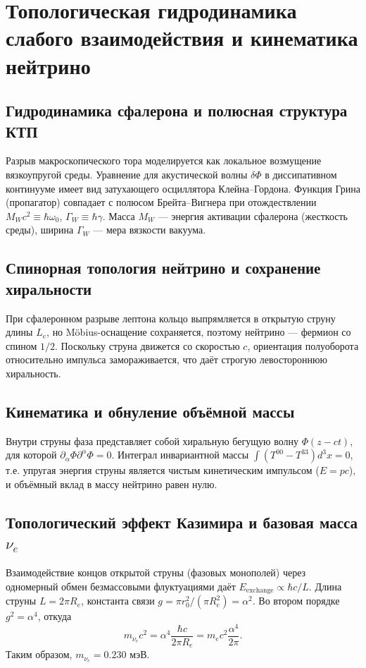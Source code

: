 \documentclass[11pt,a4paper]{article}
\begin{document}
	\section{Топологическая гидродинамика слабого взаимодействия и кинематика нейтрино}
	
	\subsection{Гидродинамика сфалерона и полюсная структура КТП}
	Разрыв макроскопического тора моделируется как локальное возмущение вязкоупругой среды. Уравнение для акустической волны $\delta\Phi$ в диссипативном континууме имеет вид затухающего осциллятора Клейна–Гордона. Функция Грина (пропагатор) совпадает с полюсом Брейта–Вигнера при отождествлении $M_W c^2\equiv\hbar\omega_0$, $\Gamma_W\equiv\hbar\gamma$. Масса $M_W$ — энергия активации сфалерона (жесткость среды), ширина $\Gamma_W$ — мера вязкости вакуума.
	
	\subsection{Спинорная топология нейтрино и сохранение хиральности}
	При сфалеронном разрыве лептона кольцо выпрямляется в открытую струну длины $L_e$, но Möbius-оснащение сохраняется, поэтому нейтрино — фермион со спином $1/2$. Поскольку струна движется со скоростью $c$, ориентация полуоборота относительно импульса замораживается, что даёт строгую левостороннюю хиральность.
	
	\subsection{Кинематика и обнуление объёмной массы}
	Внутри струны фаза представляет собой хиральную бегущую волну $\Phi(z-ct)$, для которой $\partial_\alpha\Phi\partial^\alpha\Phi=0$. Интеграл инвариантной массы $\int(T^{00}-T^{33})d^3x=0$, т.е. упругая энергия струны является чистым кинетическим импульсом ($E=pc$), и объёмный вклад в массу нейтрино равен нулю.
	
	\subsection{Топологический эффект Казимира и базовая масса $\nu_e$}
	Взаимодействие концов открытой струны (фазовых монополей) через одномерный обмен безмассовыми флуктуациями даёт $E_{\text{exchange}} \propto \hbar c/L$. Длина струны $L=2\pi R_e$, константа связи $g = \pi r_0^2/(\pi R_e^2)=\alpha^2$. Во втором порядке $g^2=\alpha^4$, откуда
	\begin{equation}
		m_{\nu_e} c^2 = \alpha^4 \frac{\hbar c}{2\pi R_e} = m_e c^2 \frac{\alpha^4}{2\pi}.
	\end{equation}
	Таким образом, $m_{\nu_e}=0.230$ мэВ.
	
\end{document}
